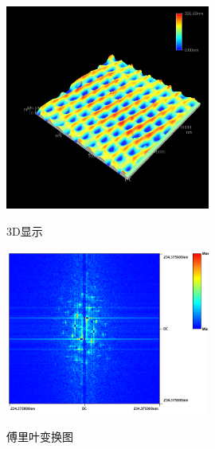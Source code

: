 \documentclass[a4paper]{article}
\begin{document}
\begin{figure}[htbp]
\centering
\includegraphics[width=0.6\textwidth]{data/0/hengxl0003D.png}\\
\caption{3D显示}\label{fig7}
\end{figure}

\begin{figure}[htbp]
\centering
\includegraphics[width=0.6\textwidth]{data/0/hengxl000_FFT.png}\\
\caption{傅里叶变换图}\label{fig8}
\end{figure}
\end{document}
